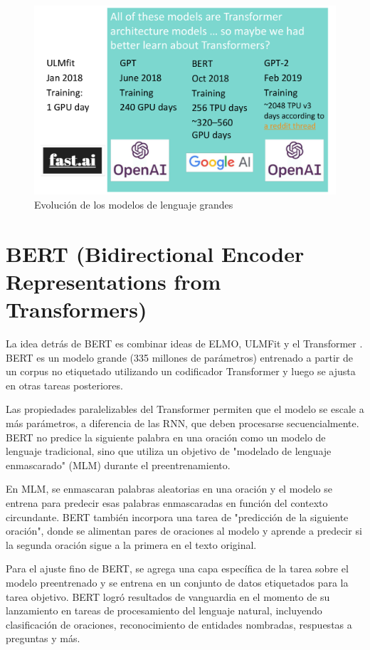 \begin{figure}[h]
  \centering
  \includegraphics[scale=0.28]{pics/llmscale_trans.png}
  \caption{Evolución de los modelos de lenguaje grandes}
\end{figure}

\section{BERT (Bidirectional Encoder Representations from Transformers)}

La idea detrás de BERT es combinar ideas de ELMO, ULMFit y el Transformer \cite{kenton2019bert}. BERT es un modelo grande (335 millones de parámetros) entrenado a partir de un corpus no etiquetado utilizando un codificador Transformer y luego se ajusta en otras tareas posteriores.

Las propiedades paralelizables del Transformer permiten que el modelo se escale a más parámetros, a diferencia de las RNN, que deben procesarse secuencialmente. BERT no predice la siguiente palabra en una oración como un modelo de lenguaje tradicional, sino que utiliza un objetivo de "modelado de lenguaje enmascarado" (MLM) durante el preentrenamiento.

En MLM, se enmascaran palabras aleatorias en una oración y el modelo se entrena para predecir esas palabras enmascaradas en función del contexto circundante. BERT también incorpora una tarea de "predicción de la siguiente oración", donde se alimentan pares de oraciones al modelo y aprende a predecir si la segunda oración sigue a la primera en el texto original.

Para el ajuste fino de BERT, se agrega una capa específica de la tarea sobre el modelo preentrenado y se entrena en un conjunto de datos etiquetados para la tarea objetivo. BERT logró resultados de vanguardia en el momento de su lanzamiento en tareas de procesamiento del lenguaje natural, incluyendo clasificación de oraciones, reconocimiento de entidades nombradas, respuestas a preguntas y más.

